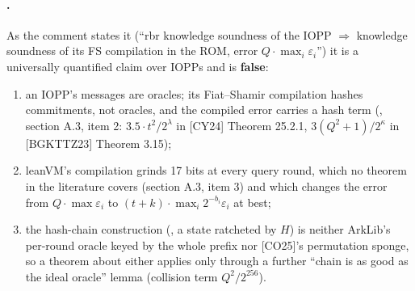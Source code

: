 \paragraph{.} As the comment states it (``rbr knowledge soundness of the
IOPP $⇒$ knowledge soundness of its FS compilation in the ROM, error $Q · \max_i ε_i$'') it is a
universally quantified claim over IOPPs and is \textbf{false}:
\begin{enumerate}[label=(\alph*)]
\item an IOPP's messages are oracles; its Fiat--Shamir compilation hashes commitments, not oracles,
  and the compiled error carries a hash term (, section A.3, item 2:
  $3.5·t^2/2^λ$ in [CY24] Theorem 25.2.1, $3(Q^2+1)/2^κ$ in [BGKTTZ23] Theorem 3.15);
\item leanVM's compilation grinds 17 bits at every query round, which no theorem in the literature
  covers (section A.3, item 3) and which changes the error from $Q·\max ε_i$ to
  $(t + k)·\max_i 2^{−b_i}ε_i$ at best;
\item the hash-chain construction (, a state ratcheted by $H$) is neither
  ArkLib's per-round oracle keyed by the whole prefix nor [CO25]'s permutation sponge, so a theorem
  about either applies only through a further ``chain is as good as the ideal oracle'' lemma
  (collision term $Q^2/2^{256}$).
\end{enumerate}
